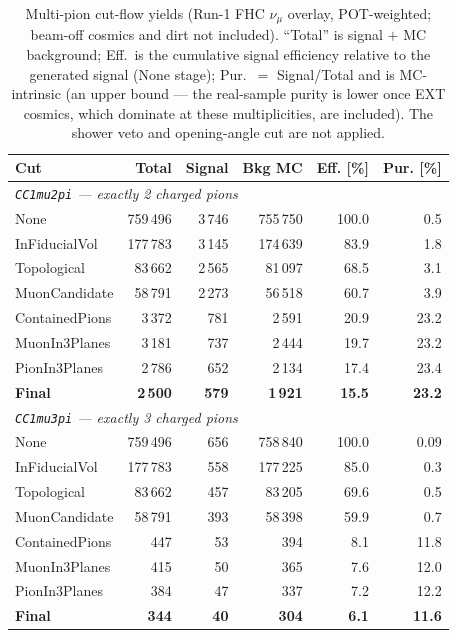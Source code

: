 \documentclass[11pt,a4paper]{article}
\begin{document}
\begin{table}[H]
  \centering
  \caption{Multi-pion cut-flow yields (Run-1 FHC $\nu_\mu$ overlay, POT-weighted;
    beam-off cosmics and dirt not included). ``Total'' is signal $+$ MC background; Eff.\
    is the cumulative signal efficiency relative to the generated signal (None stage);
    Pur.\ $=$ Signal/Total and is MC-intrinsic (an upper bound --- the real-sample purity
    is lower once EXT cosmics, which dominate at these multiplicities, are included). The
    shower veto and opening-angle cut are not applied.}
  \label{tab:mp_cutflow}
  \small
  \begin{tabular}{lrrrrr}
    \toprule
    Cut & Total & Signal & Bkg MC & Eff. [\%] & Pur. [\%] \\
    \midrule
    \multicolumn{6}{l}{\textit{\texttt{CC1mu2pi} --- exactly 2 charged pions}} \\
    None            & 759\,496 & 3\,746 & 755\,750 & 100.0 & 0.5 \\
    InFiducialVol   & 177\,783 & 3\,145 & 174\,639 & 83.9 & 1.8 \\
    Topological     & 83\,662 & 2\,565 & 81\,097 & 68.5 & 3.1 \\
    MuonCandidate   & 58\,791 & 2\,273 & 56\,518 & 60.7 & 3.9 \\
    ContainedPions  & 3\,372 & 781 & 2\,591 & 20.9 & 23.2 \\
    MuonIn3Planes   & 3\,181 & 737 & 2\,444 & 19.7 & 23.2 \\
    PionIn3Planes   & 2\,786 & 652 & 2\,134 & 17.4 & 23.4 \\
    \textbf{Final}  & \textbf{2\,500} & \textbf{579} & \textbf{1\,921} & \textbf{15.5} & \textbf{23.2} \\
    \midrule
    \multicolumn{6}{l}{\textit{\texttt{CC1mu3pi} --- exactly 3 charged pions}} \\
    None            & 759\,496 & 656 & 758\,840 & 100.0 & 0.09 \\
    InFiducialVol   & 177\,783 & 558 & 177\,225 & 85.0 & 0.3 \\
    Topological     & 83\,662 & 457 & 83\,205 & 69.6 & 0.5 \\
    MuonCandidate   & 58\,791 & 393 & 58\,398 & 59.9 & 0.7 \\
    ContainedPions  & 447 & 53 & 394 & 8.1 & 11.8 \\
    MuonIn3Planes   & 415 & 50 & 365 & 7.6 & 12.0 \\
    PionIn3Planes   & 384 & 47 & 337 & 7.2 & 12.2 \\
    \textbf{Final}  & \textbf{344} & \textbf{40} & \textbf{304} & \textbf{6.1} & \textbf{11.6} \\
    \bottomrule
  \end{tabular}
\end{table}
\end{document}

